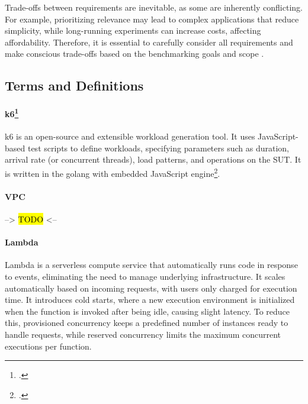 Trade-offs between requirements are inevitable, as some are inherently conflicting. For example, prioritizing relevance may lead to complex applications that reduce simplicity, while long-running experiments can increase costs, affecting affordability. Therefore, it is essential to carefully consider all requirements and make conscious trade-offs based on the benchmarking goals and scope \cite{book_bermbach_cloud_service_benchmarking}.

\subsection{Terms and Definitions}
\label{challenges}

\paragraph{k6\footcite{https://k6.io/open-source/}}
k6 is an open-source and extensible workload generation tool. It uses JavaScript-based test scripts to define workloads, specifying parameters such as duration, arrival rate (or concurrent threads), load patterns, and operations on the SUT. It is written in the golang with embedded JavaScript engine\footcite{https://github.com/grafana/k6}.

\paragraph{VPC} --> \hl{TODO} <--


\paragraph{Lambda}
Lambda is a serverless compute service that automatically runs code in response to events, eliminating the need to manage underlying infrastructure. It scales automatically based on incoming requests, with users only charged for execution time. It introduces cold starts, where a new execution environment is initialized when the function is invoked after being idle, causing slight latency. To reduce this, provisioned concurrency keeps a predefined number of instances ready to handle requests, while reserved concurrency limits the maximum concurrent executions per function.

